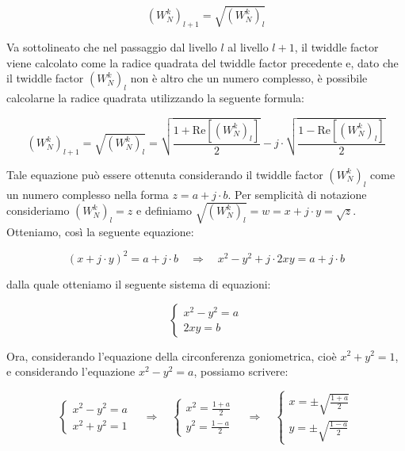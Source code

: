 \documentclass[a4paper,12pt]{report}  %
\begin{document}
\begin{equation}
    \left ( W_N^{k} \right )_{l + 1} = \sqrt{\left ( W_N^{k} \right )_l} \nonumber
\end{equation}

Va sottolineato che nel passaggio dal livello $l$ al livello $l + 1$, il twiddle factor viene calcolato come la radice quadrata del twiddle factor precedente e, dato che il twiddle factor $\left ( W_N^{k} \right )_l$ non è altro che un numero complesso, è possibile calcolarne la radice quadrata utilizzando la seguente formula:

\begin{equation}
    \left ( W_N^{k} \right )_{l + 1} = \sqrt{\left ( W_N^{k} \right )_l} = \sqrt{\frac{1 + \text{Re}\left [ \left ( W_N^{k} \right )_l \right ]}{2}} - j \cdot \sqrt{\frac{1 - \text{Re}\left [ \left ( W_N^{k} \right )_l \right ]}{2}} \nonumber
\end{equation}

Tale equazione può essere ottenuta considerando il twiddle factor $\left ( W_N^{k} \right )_l$ come un numero complesso nella forma $z = a + j \cdot b$.
Per semplicità di notazione consideriamo $\left ( W_N^{k} \right )_l = z$ e definiamo $\sqrt{\left ( W_N^{k} \right )_l} = w = x + j \cdot y = \sqrt{z}$.
Otteniamo, così la seguente equazione:

\begin{equation}
    (x + j \cdot y)^2 = a + j \cdot b \quad \Longrightarrow \quad x^2 - y^2 + j \cdot 2xy = a + j \cdot b \nonumber
\end{equation}

dalla quale otteniamo il seguente sistema di equazioni:

\begin{equation}
    \begin{cases}
        x^2 - y^2 = a \\
        2xy = b
    \end{cases} \nonumber
\end{equation}

Ora, considerando l'equazione della circonferenza goniometrica, cioè $x^2 + y^2 = 1$, e considerando l'equazione $x^2 - y^2 = a$, possiamo scrivere:

\begin{equation}
    \begin{cases}
        x^2 - y^2 = a \\
        x^2 + y^2 = 1
    \end{cases} \quad \Longrightarrow \quad
    \begin{cases}
        x^2 = \frac{1 + a}{2} \\
        y^2 = \frac{1 - a}{2}
    \end{cases} \quad \Longrightarrow \quad
    \begin{cases}
        x = \pm \sqrt{\frac{1 + a}{2}} \\
        y = \pm \sqrt{\frac{1 - a}{2}}
    \end{cases} \nonumber
\end{equation}
\end{document}
